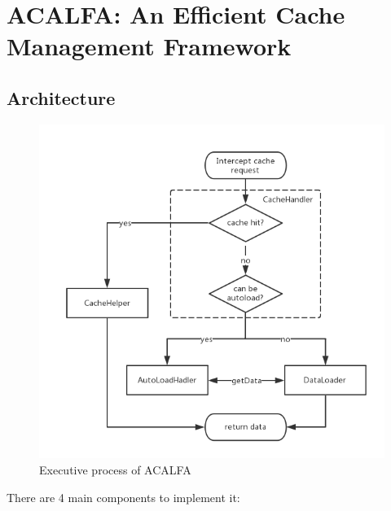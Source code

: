 \documentclass[conference]{IEEEtran}
\begin{document}
\section{ACALFA: An Efficient Cache Management Framework}
\label{Framework}

\subsection{Architecture}

\begin{figure} [htb]
    \centering
    \includegraphics[width=1\linewidth]{img/architecture.png}
    \caption{Executive process of ACALFA}
    \label{Executive process of ACALFA}
\end{figure}

There are 4 main components to implement it:
\end{document}
